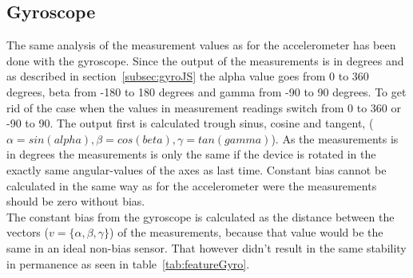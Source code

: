 \subsection{Gyroscope}
The same analysis of the measurement values as for the accelerometer has been done with the gyroscope. Since the output of the measurements is in degrees and as described in section~\ref{subsec:gyroJS} the alpha value goes from 0 to 360 degrees, beta from -180 to 180 degrees and gamma from -90 to 90 degrees. To get rid of the case when the values in measurement readings switch from 0 to 360 or -90 to 90. The output first is calculated trough sinus, cosine and tangent, ($\alpha=sin(alpha), \beta=cos(beta), \gamma=tan(gamma)$). As the measurements is in degrees the measurements is only the same if the device is rotated in the exactly same angular-values of the axes as last time. Constant bias cannot be calculated in the same way as for the accelerometer were the measurements should be zero without bias.\\
The constant bias from the gyroscope is calculated as the distance between the vectors ($v=\{\alpha, \beta,\gamma\}$) of the measurements, because that value would be the same in an ideal non-bias sensor.
That however didn't result in the same stability in permanence as seen in table~\ref{tab:featureGyro}.

